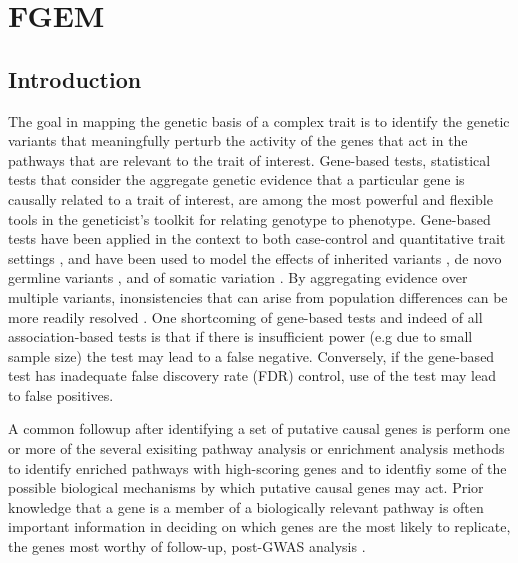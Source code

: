 
\chapter{FGEM}




\section{Introduction}\label{sec:org28fe636}

The goal in mapping the genetic basis of a complex trait is to identify the genetic variants that meaningfully perturb the activity of the genes that act in the pathways that are relevant to the trait of interest.  Gene-based tests, statistical tests that consider the aggregate genetic evidence that a particular gene is causally related to a trait of interest, are among the most powerful and flexible tools in the geneticist's toolkit for relating genotype to phenotype.  Gene-based tests have been applied in the context to both case-control \cite{skat} and  quantitative trait settings \cite{predixcan}, and have been used to model the effects of inherited variants \cite{skat}, de novo germline variants \cite{TADA}, and of somatic variation \cite{drivermaps}. By aggregating evidence over multiple variants, inonsistencies that can arise from population differences can be more readily resolved \cite{Neale_2004}. One shortcoming of gene-based tests and indeed of all association-based tests is that if there is insufficient power (e.g due to small sample size) the test may lead to a false negative.  Conversely, if the gene-based test has inadequate false discovery rate (FDR) control, use of the test may lead to false positives.

A common followup after identifying a set of putative causal genes is perform one or more of the several exisiting pathway analysis or enrichment analysis methods \cite{rss-e} \cite{Carbonetto_2013} \cite{Lamparter_2016} to identify enriched pathways with high-scoring genes and to identfiy some of the possible biological mechanisms by which putative causal genes may act. Prior knowledge that a gene is a member of a biologically relevant pathway is often important information in deciding on which genes are the most likely to replicate, the genes most worthy of follow-up, post-GWAS analysis \cite{Hou_2013}.

